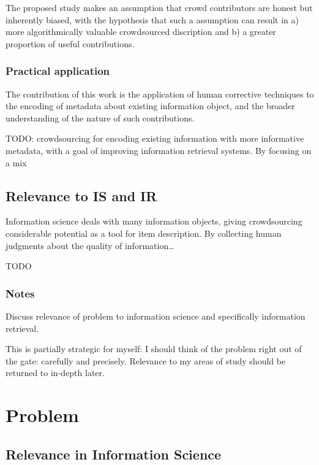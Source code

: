 The proposed study makes an assumption that crowd contributors are
honest but inherently biased, with the hypothesis that such a assumption
can result in a) more algorithmically valuable crowdsourced discription
and b) a greater proportion of useful contributions.

\subsubsection{Practical application}\label{practical-application}

The contribution of this work is the application of human corrective
techniques to the encoding of metadata about existing information
object, and the broader understanding of the nature of such
contributions.

TODO: crowdsourcing for encoding existing information with more
informative metadata, with a goal of improving information retrieval
systems. By focusing on a mix

\subsection{Relevance to IS and IR}\label{relevance-to-is-and-ir}

Information science deals with many information objects, giving
crowdsourcing considerable potential as a tool for item description. By
collecting human judgments about the quality of information\ldots{}

TODO

\subsubsection{Notes}\label{notes-1}

Discuss relevance of problem to information science and specifically
information retrieval.

This is partially strategic for myself: I should think of the problem
right out of the gate: carefully and precisely. Relevance to my areas of
study should be returned to in-depth later.

\section{Problem}\label{problem}

\subsection{Relevance in Information
Science}\label{relevance-in-information-science}

